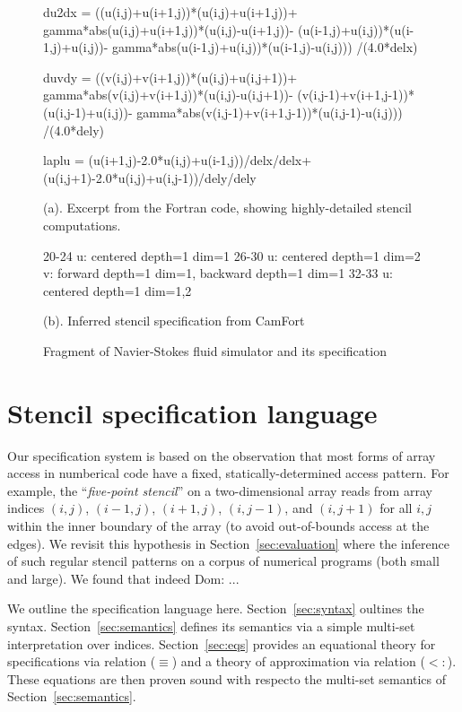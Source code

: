 \documentclass[9pt]{sigplanconf}
\newcommand{\dnote}[1]{\textcolor{darkpurple}{Dom: #1}}
\theoremstyle{definition}
\begin{document}
\begin{figure}
\begin{ExmVerbatim}[firstnumber=20]
du2dx = ((u(i,j)+u(i+1,j))*(u(i,j)+u(i+1,j))+ 
    gamma*abs(u(i,j)+u(i+1,j))*(u(i,j)-u(i+1,j))- 
    (u(i-1,j)+u(i,j))*(u(i-1,j)+u(i,j))- 
    gamma*abs(u(i-1,j)+u(i,j))*(u(i-1,j)-u(i,j))) 
    /(4.0*delx)

duvdy = ((v(i,j)+v(i+1,j))*(u(i,j)+u(i,j+1))+ 
   gamma*abs(v(i,j)+v(i+1,j))*(u(i,j)-u(i,j+1))- 
   (v(i,j-1)+v(i+1,j-1))*(u(i,j-1)+u(i,j))-  
   gamma*abs(v(i,j-1)+v(i+1,j-1))*(u(i,j-1)-u(i,j))) 
   /(4.0*dely)

laplu = (u(i+1,j)-2.0*u(i,j)+u(i-1,j))/delx/delx+ 
          (u(i,j+1)-2.0*u(i,j)+u(i,j-1))/dely/dely
\end{ExmVerbatim} 
(a). Excerpt from the Fortran code, 
showing highly-detailed stencil computations. \\

\begin{SpecVerbatim}[xleftmargin=0.1cm]
20-24  u: centered depth=1 dim=1
26-30  u: centered depth=1 dim=2
       v: forward depth=1 dim=1, backward depth=1 dim=1
32-33  u: centered depth=1 dim=1,2
\end{SpecVerbatim}
(b). Inferred stencil specification from CamFort
\caption{Fragment of Navier-Stokes fluid simulator and its specification}
\label{ref:navier-stokes-fragment}
\end{figure}

\section{Stencil specification language}
\label{sec:lang}

Our specification system is based on the observation
that most forms of array access in numberical code have 
a fixed, statically-determined access pattern. For example, the 
``\emph{five-point stencil}'' on a two-dimensional array reads from array
indices $(i, j)$, $(i-1, j)$, $(i+1, j)$, $(i, j-1)$, and $(i, j+1)$
for all $i, j$ within the inner boundary of the array (to avoid 
out-of-bounds access at the edges). We revisit this hypothesis 
in Section~\ref{sec:evaluation} where the inference of
such regular stencil patterns on a corpus of numerical programs (both
small and large). We found that indeed \dnote{..}. 

We outline the specification language here. Section~\ref{sec:syntax}
oultines the syntax. Section~\ref{sec:semantics} defines its semantics
via a simple multi-set interpretation over indices. Section~\ref{sec:eqs} provides an
equational theory for specifications via relation ($\equiv$) and a
theory of approximation via relation ($<:$). These equations are then
proven sound with respecto the multi-set semantics of Section~\ref{sec:semantics}.
\end{document}
